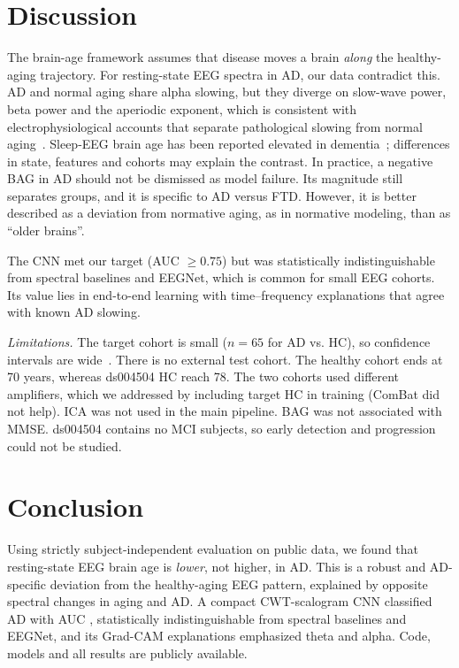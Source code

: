 \documentclass[conference]{IEEEtran}
\begin{document}
\section{Discussion}
The brain-age framework assumes that disease moves a brain \emph{along} the healthy-aging trajectory. For resting-state EEG spectra in AD, our data contradict this. AD and normal aging share alpha slowing, but they diverge on slow-wave power, beta power and the aperiodic exponent, which is consistent with electrophysiological accounts that separate pathological slowing from normal aging~\cite{babiloni2020}. Sleep-EEG brain age has been reported elevated in dementia~\cite{sun2019}; differences in state, features and cohorts may explain the contrast. In practice, a negative BAG in AD should not be dismissed as model failure. Its magnitude still separates groups, and it is specific to AD versus FTD. However, it is better described as a deviation from normative aging, as in normative modeling, than as ``older brains''.

The CNN met our target (AUC $\geq0.75$) but was statistically indistinguishable from spectral baselines and EEGNet, which is common for small EEG cohorts. Its value lies in end-to-end learning with time--frequency explanations that agree with known AD slowing.

\emph{Limitations.} The target cohort is small ($n=65$ for AD vs. HC), so confidence intervals are wide~\cite{varoquaux2018}. There is no external test cohort. The healthy cohort ends at 70 years, whereas ds004504 HC reach 78. The two cohorts used different amplifiers, which we addressed by including target HC in training (ComBat did not help). ICA was not used in the main pipeline. BAG was not associated with MMSE. ds004504 contains no MCI subjects, so early detection and progression could not be studied.

\section{Conclusion}
Using strictly subject-independent evaluation on public data, we found that resting-state EEG brain age is \emph{lower}, not higher, in AD. This is a robust and AD-specific deviation from the healthy-aging EEG pattern, explained by opposite spectral changes in aging and AD. A compact CWT-scalogram CNN classified AD with AUC \cnnAUC{}, statistically indistinguishable from spectral baselines and EEGNet, and its Grad-CAM explanations emphasized theta and alpha. Code, models and all results are publicly available.



\end{document}
